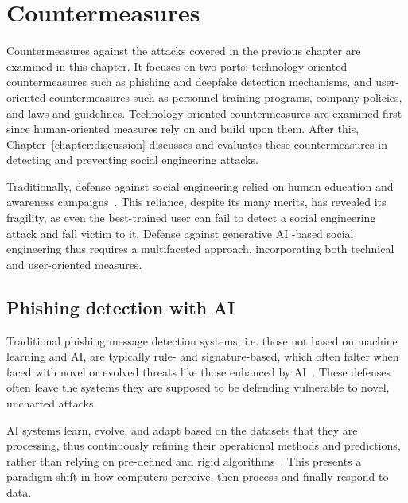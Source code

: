 \chapter{Countermeasures\label{chapter:countermeasures}}
\begin{comment}
\end{comment}

Countermeasures against the attacks covered in the previous chapter are examined in this chapter. It focuses on two parts: technology-oriented countermeasures such as phishing and deepfake detection mechanisms, and user-oriented countermeasures such as personnel training programs, company policies, and laws and guidelines. Technology-oriented countermeasures are examined first since human-oriented measures rely on and build upon them. After this, Chapter~\ref{chapter:discussion} discusses and evaluates these countermeasures in detecting and preventing social engineering attacks.

Traditionally, defense against social engineering relied on human education and awareness campaigns~\citep{fakhouri_AI_Driven_Solutions_SE_Attacks_2024}. This reliance, despite its many merits, has revealed its fragility, as even the best-trained user can fail to detect a social engineering attack and fall victim to it. Defense against generative AI -based social engineering thus requires a multifaceted approach, incorporating both technical and user-oriented measures.


\section{Phishing detection with AI}
\begin{comment}
\end{comment}
Traditional phishing message detection systems, i.e. those not based on machine learning and AI, are typically rule- and signature-based, which often falter when faced with novel or evolved threats like those enhanced by AI~\citep{fakhouri_AI_Driven_Solutions_SE_Attacks_2024}. These defenses often leave the systems they are supposed to be defending vulnerable to novel, uncharted attacks.

AI systems learn, evolve, and adapt based on the datasets that they are processing, thus continuously refining their operational methods and predictions, rather than relying on pre-defined and rigid algorithms~\citep{fakhouri_AI_Driven_Solutions_SE_Attacks_2024}. This presents a paradigm shift in how computers perceive, then process and finally respond to data.

